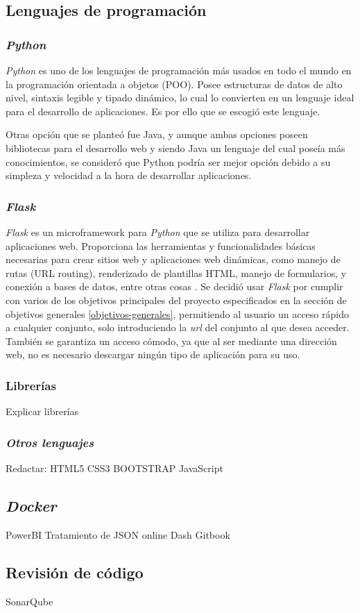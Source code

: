 \subsection{Lenguajes de programación}

\subsubsection{\textit{Python}}
\textit{Python} es uno de los lenguajes de programación más usados en todo el mundo en la programación orientada a objetos (POO). Posee estructuras de datos de alto nivel, sintaxis legible y tipado dinámico, lo cual lo convierten en un lenguaje ideal para el desarrollo de aplicaciones. Es por ello que se escogió este lenguaje.\cite{python}

Otras opción que se planteó fue Java, y aunque ambas opciones poseen bibliotecas para el desarrollo web y siendo Java un lenguaje del cual poseía más conocimientos, se consideró que Python podría ser mejor opción debido a su simpleza y velocidad a la hora de desarrollar aplicaciones.

\subsubsection{\textit{Flask}}\label{flask}
\textit{Flask} es un microframework para \textit{Python} que se utiliza para desarrollar aplicaciones web. Proporciona las herramientas y funcionalidades básicas necesarias para crear sitios web y aplicaciones web dinámicas, como manejo de rutas (URL routing), renderizado de plantillas HTML, manejo de formularios, y conexión a bases de datos, entre otras cosas \cite{FlaskSite}. 
Se decidió usar \textit{Flask} por cumplir con varios de los objetivos principales del proyecto especificados en la sección de objetivos generales \ref{objetivos-generales}, permitiendo al usuario un acceso rápido a cualquier conjunto, solo introduciendo la \textit{url} del conjunto al que desea acceder. También se garantiza un acceso cómodo, ya que al ser mediante una dirección web, no es necesario descargar ningún tipo de aplicación para su uso.

\subsubsection{Librerías}
Explicar librerías


\subsubsection{\textit{Otros lenguajes}}
Redactar:
HTML5 
CSS3 
BOOTSTRAP 
JavaScript 

\subsection{\textit{Docker}}\label{docker}


PowerBI
Tratamiento de JSON online
Dash
Gitbook

\subsection{Revisión de código}
SonarQube